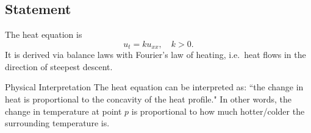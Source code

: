 \subsection{Statement}
The heat equation is 
\[
    u_t = ku_{xx}, \quad k > 0.
\]
It is derived via balance laws with Fourier's law of heating, i.e.\ heat flows in the direction of steepest descent.
\begin{details}{Physical Interpretation}
The heat equation can be interpreted as: ``the change in heat is proportional to the concavity of the heat profile." In other words, the change in temperature at point $p$ is proportional to how much hotter/colder the surrounding temperature is.
\end{details}

